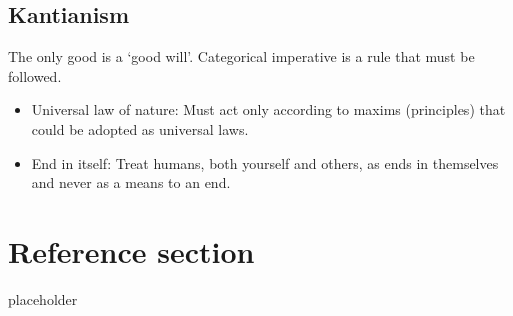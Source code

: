\documentclass{article}
\begin{document}
\subsection{Kantianism}
\begin{flushleft}
The only good is a ‘good will’. Categorical imperative is a rule that must be followed.
\begin{itemize}
  \item Universal law of nature: Must act only according to maxims (principles) that could be adopted as universal laws.
  \item End in itself: Treat humans, both yourself and others, as ends in themselves and never as a means to an end.
\end{itemize}
\end{flushleft}

\pagebreak
\section*{Reference section} \label{sec:reference}
\begin{description}
	\item[placeholder] \hfill \\
\end{description}
\end{document}
